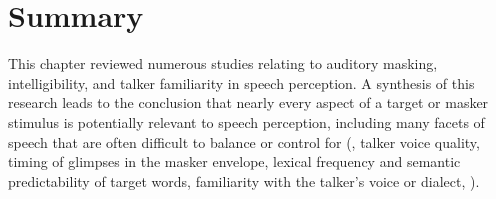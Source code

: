 
\section[Summary]{Summary\label{sec:Summary}}
This chapter reviewed numerous studies relating to auditory masking, intelligibility, and talker familiarity in speech perception.  A synthesis of this research leads to the conclusion that nearly every aspect of a target or masker stimulus is potentially relevant to speech perception, including many facets of speech that are often difficult to balance or control for (\eg, talker voice quality, timing of glimpses in the masker envelope, lexical frequency and semantic predictability of target words, familiarity with the talker’s voice or dialect, \etc).  %
